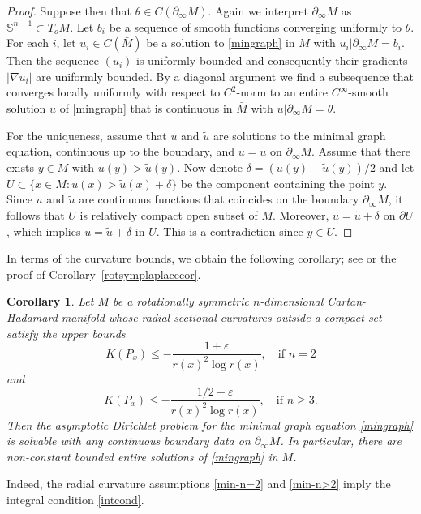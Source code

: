 \documentclass[10pt,a4paper,reqno]{amsart}
\newcommand{\ve}{\varepsilon}
\newcommand{\Ss}{\mathbb{S}}
\newcommand{\p}{\partial}
\newcommand{\pinf}{\partial_{\infty}}
\numberwithin{equation}{section}
\theoremstyle{plain}
\newtheorem{cor}[thm]{Corollary}
\theoremstyle{definition}
\begin{document}
\begin{proof}
Suppose then that $\theta\in C(\pinf M)$. Again we interpret $\pinf M$ as $\Ss^{n-1}\subset T_o M$. Let $b_i$ be a sequence of smooth
functions converging uniformly to $\theta$. For each $i$, let $u_i\in C(\bar{M})$ be a solution to \eqref{mingraph} in $M$ with 
$u_i|\pinf M =b_i$. Then the sequence $(u_i)$ is uniformly bounded and consequently their gradients $|\nabla u_i|$ are uniformly bounded. By a diagonal 
argument we find a subsequence that converges locally uniformly with respect to $C^2$-norm to an entire $C^\infty$-smooth solution $u$ of \eqref{mingraph}
that is continuous in $\bar{M}$ with $u|\pinf M=\theta$.          
     
For the uniqueness, assume that $u$ and $\tilde u$ are solutions to the minimal graph equation, continuous
up to the boundary, and $u=\tilde u$ on $\pinf M$. Assume that there exists $y\in M$ with $u(y) > \tilde u(y)$.
Now denote $\delta = (u(y) - \tilde u(y))/2$ and let $U\subset \{x\in M \colon u(x) > \tilde u(x) +\delta\}$
be the component containing the point $y$. Since $u$ and $\tilde u$ are continuous functions that coincides
on the boundary $\pinf M$, it follows that $U$ is relatively compact open subset of $M$. Moreover,
$u = \tilde u +\delta$ on $\p U$, which implies $u = \tilde u+\delta$ in $U$. This is a contradiction
since $y \in U$.
\end{proof}

In terms of the curvature bounds, we obtain the following corollary; see \cite[Theorem 2]{march} or the proof of Corollary~\ref{rotsymplaplacecor}.
\begin{cor}\label{rotsymmingraphcor}
Let $M$ be a rotationally symmetric $n$-dimensional Cartan-Hadamard manifold whose radial sectional curvatures outside a compact set 
	satisfy the upper bounds
	 \begin{equation}\label{min-n=2}
	K(P_x) \le - \frac{1 + \ve }{r(x)^2 \log r(x)}, \quad \text{if } n=2 
	 \end{equation}
      	and
   	 \begin{equation}\label{min-n>2}
  	K(P_x) \le - \frac{1/2 + \ve }{r(x)^2 \log r(x)}, \quad \text{if } n\ge3. 	 
   	 \end{equation}
     		Then the asymptotic Dirichlet problem for the minimal graph equation \eqref{mingraph} is
	solvable with any continuous boundary data on $\pinf M$. 
In particular, there are non-constant bounded entire solutions of \eqref{mingraph} in $M$.
\end{cor}
Indeed, the radial curvature assumptions \eqref{min-n=2} and \eqref{min-n>2} imply the integral condition \eqref{intcond}.
\end{document}
